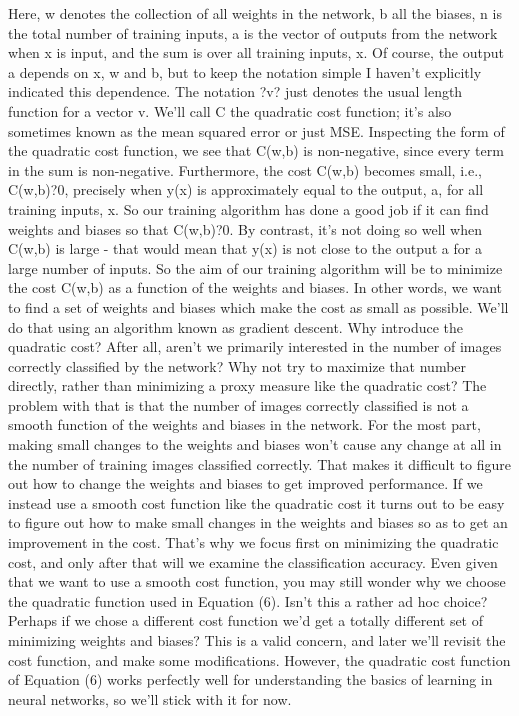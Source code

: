 Here, w denotes the collection of all weights in the network, b all the biases, n is the total number of training inputs, a is the vector of outputs from the network when x is input, and the sum is over all training inputs, x. Of course, the output a depends on x, w and b, but to keep the notation simple I haven't explicitly indicated this dependence. The notation ?v? just denotes the usual length function for a vector v. We'll call C the quadratic cost function; it's also sometimes known as the mean squared error or just MSE. Inspecting the form of the quadratic cost function, we see that C(w,b) is non-negative, since every term in the sum is non-negative. Furthermore, the cost C(w,b) becomes small, i.e., C(w,b)?0, precisely when y(x) is approximately equal to the output, a, for all training inputs, x. So our training algorithm has done a good job if it can find weights and biases so that C(w,b)?0. By contrast, it's not doing so well when C(w,b) is large - that would mean that y(x) is not close to the output a for a large number of inputs. So the aim of our training algorithm will be to minimize the cost C(w,b) as a function of the weights and biases. In other words, we want to find a set of weights and biases which make the cost as small as possible. We'll do that using an algorithm known as gradient descent.
Why introduce the quadratic cost? After all, aren't we primarily interested in the number of images correctly classified by the network? Why not try to maximize that number directly, rather than minimizing a proxy measure like the quadratic cost? The problem with that is that the number of images correctly classified is not a smooth function of the weights and biases in the network. For the most part, making small changes to the weights and biases won't cause any change at all in the number of training images classified correctly. That makes it difficult to figure out how to change the weights and biases to get improved performance. If we instead use a smooth cost function like the quadratic cost it turns out to be easy to figure out how to make small changes in the weights and biases so as to get an improvement in the cost. That's why we focus first on minimizing the quadratic cost, and only after that will we examine the classification accuracy.
Even given that we want to use a smooth cost function, you may still wonder why we choose the quadratic function used in Equation (6). Isn't this a rather ad hoc choice? Perhaps if we chose a different cost function we'd get a totally different set of minimizing weights and biases? This is a valid concern, and later we'll revisit the cost function, and make some modifications. However, the quadratic cost function of Equation (6) works perfectly well for understanding the basics of learning in neural networks, so we'll stick with it for now.
